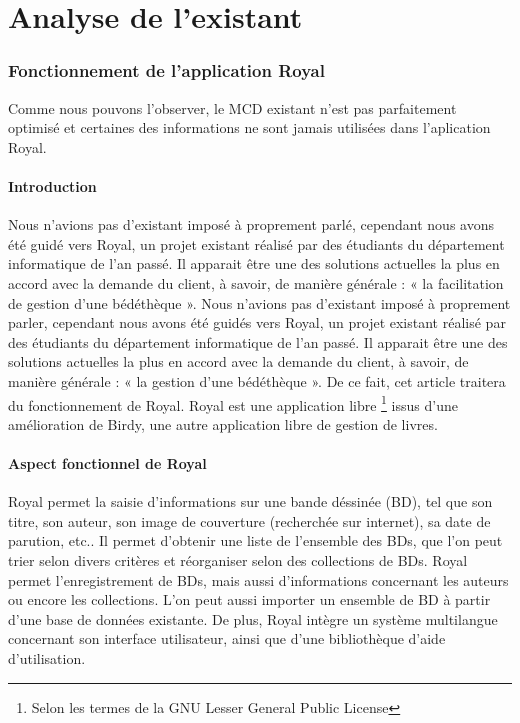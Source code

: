 \part{Analyse de l'existant}


\section{Fonctionnement de l'application Royal}

Comme nous pouvons l'observer, le MCD existant n'est pas parfaitement optimisé et certaines des informations ne sont jamais utilisées dans l'aplication Royal. 

\subsection{Introduction}
Nous n'avions pas d'existant imposé à proprement parlé, cependant nous avons été guidé vers Royal, un projet existant réalisé par des étudiants du département informatique de l'an passé.
Il apparait être une des solutions actuelles la plus en accord avec la demande du client, à savoir, de manière générale : « la facilitation de gestion d'une bédéthèque ».
Nous n'avions pas d'existant imposé à proprement parler, cependant nous avons été guidés vers Royal, un projet existant réalisé par des étudiants du département informatique de l'an passé.
Il apparait être une des solutions actuelles la plus en accord avec la demande du client, à savoir, de manière générale : « la gestion d'une bédéthèque ».
De ce fait, cet article traitera du fonctionnement de Royal.
Royal est une application 
libre \footnote{Selon les termes de la GNU Lesser General Public License}
issus d'une amélioration de Birdy, une autre application libre de gestion de livres.

\subsection{Aspect fonctionnel de Royal}
Royal permet la saisie d'informations sur une bande déssinée (BD), tel que son titre, son auteur, son image de couverture (recherchée sur internet), sa date de parution, etc..
Il permet d'obtenir une liste de l'ensemble des BDs, que l'on peut trier selon divers critères et réorganiser selon des collections de BDs.
Royal permet l'enregistrement de BDs, mais aussi d'informations concernant les auteurs ou encore les collections.
L'on peut aussi importer un ensemble de BD à partir d'une base de données existante.
De plus, Royal intègre un système multilangue concernant son interface utilisateur, ainsi que d'une bibliothèque d'aide d'utilisation.

